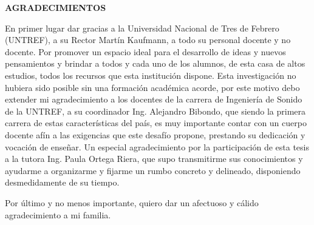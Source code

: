 \begin{centering}
\Large{\textbf{AGRADECIMIENTOS}}

\end{centering}

En primer lugar dar gracias a la Universidad Nacional de Tres de Febrero (UNTREF), a su Rector Martín Kaufmann, a todo su personal docente y no docente. Por promover un espacio ideal para el desarrollo de ideas y nuevos pensamientos y brindar a todos y cada uno de los alumnos, de esta casa de altos estudios, todos los recursos que esta institución dispone.   
Esta investigación no hubiera sido posible sin una formación académica acorde, por este motivo debo extender mi agradecimiento a los docentes de la carrera de Ingeniería de Sonido de la UNTREF, a su coordinador Ing. Alejandro Bibondo, que siendo la primera carrera de estas características del país, es muy importante contar con un cuerpo docente afín a las exigencias que este desafío propone, prestando su dedicación y vocación de enseñar. 
Un especial agradecimiento por la participación de esta tesis a la tutora Ing. Paula Ortega Riera, que supo transmitirme sus conocimientos y ayudarme a organizarme y fijarme un rumbo concreto y delineado, disponiendo desmedidamente de su tiempo. 

Por último y no menos importante, quiero dar un afectuoso y cálido agradecimiento a mi familia.

\newpage

